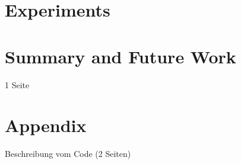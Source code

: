 \documentclass[
     12pt,         %
     a4paper,      %
     DIV=14,        %
     ]{scrreprt}
\begin{document}

\chapter{Experiments}
\label{chap:experiments}


\chapter{Summary and Future Work}
\label{chap:summary}
1 Seite


\chapter{Appendix}
\label{chap:appendix}
Beschreibung vom Code (2 Seiten)












\end{document}
